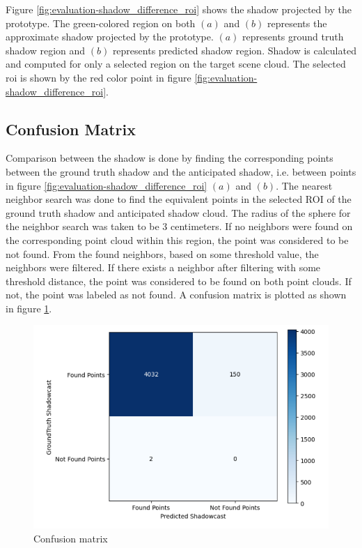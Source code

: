 Figure \ref{fig:evaluation-shadow_difference_roi} shows the shadow projected by the prototype. The green-colored region on both \((a)\) and \((b)\) represents the approximate shadow projected by the prototype. \((a)\) represents ground truth shadow region and \((b)\) represents predicted shadow region.  Shadow is calculated and computed for only a selected region on the target scene cloud. The selected \acrfull{roi} is shown by the red color point in figure \ref{fig:evaluation-shadow_difference_roi}.

\subsection{Confusion Matrix}
Comparison between the shadow is done by finding the corresponding points between the ground truth shadow and the anticipated shadow, i.e. between points in figure \ref{fig:evaluation-shadow_difference_roi} \((a)\) and \((b)\). The nearest neighbor search was done to find the equivalent points in the selected ROI of the ground truth shadow and anticipated shadow cloud. The radius of the sphere for the neighbor search was taken to be 3 centimeters. If no neighbors were found on the corresponding point cloud within this region, the point was considered to be not found. From the found neighbors, based on some threshold value, the neighbors were filtered. If there exists a neighbor after filtering with some threshold distance, the point was considered to be found on both point clouds. If not, the point was labeled as not found. A confusion matrix is plotted as shown in figure \ref{fig:evaluation_cm}.


\begin{figure}[htbp]
    \centering
    \includegraphics[width=1\linewidth]{97_graphics/evaluation/cm_shadowcast.pdf}
    \caption{Confusion matrix}
    \label{fig:evaluation_cm}
\end{figure}

